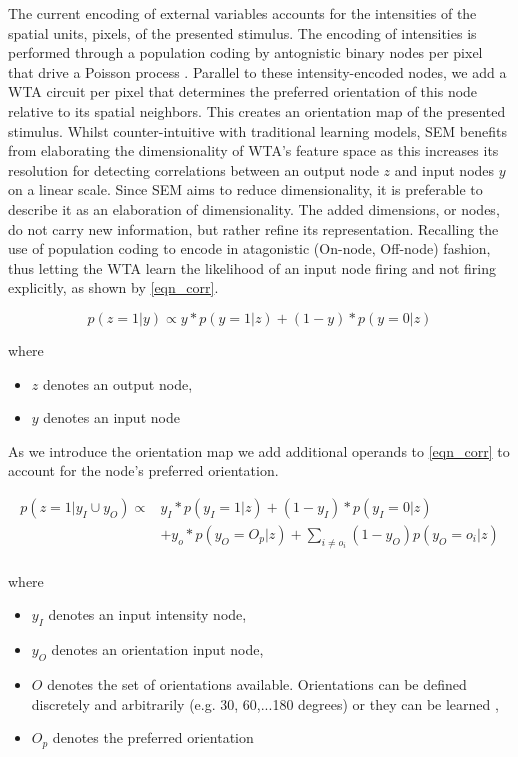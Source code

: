 \documentclass{report}
\begin{document}
The current encoding of external variables accounts for the intensities of the spatial units, pixels, of the presented stimulus. The encoding of intensities is performed through a population coding by antognistic binary nodes per pixel that drive a Poisson process \cite{Nessler2010}. Parallel to these intensity-encoded nodes, we add a WTA circuit per pixel that determines the preferred orientation of this node relative to its spatial neighbors. This creates an orientation map of the presented stimulus. Whilst counter-intuitive with traditional learning models, SEM benefits from elaborating the dimensionality of WTA's feature space as this increases its resolution for detecting correlations between an output node $z$ and input nodes $y$ on a linear scale. Since SEM aims to reduce dimensionality, it is preferable to describe it as an elaboration of dimensionality. The added dimensions, or nodes, do not carry new information, but rather refine its representation. Recalling the use of population coding to encode in atagonistic (On-node, Off-node) fashion, thus letting the WTA learn the likelihood of an input node firing and not firing explicitly, as shown by \ref{eqn_corr}.

\begin{equation}
	p(z=1|y) \propto y*p(y=1|z) + (1-y)*p(y=0|z)
	\label{eqn_corr}
\end{equation}

where
\begin{itemize}
  \item $z$ denotes an output node,
  \item $y$ denotes an input node
\end{itemize}

As we introduce the orientation map we add additional operands to \ref{eqn_corr} to account for the node's preferred orientation.

\begin{equation}
	\begin{split}
		p(z=1|y_I \cup y_O) \propto &y_I*p(y_I=1|z) + (1-y_I)*p(y_I=0|z) \\
			&+ y_o*p(y_O=O_p|z)+\sum_{i\neq o_i} (1-y_O)p(y_O=o_i|z)\\
	\end{split}
	\label{eqn_corr2}
\end{equation}

where
\begin{itemize}
  \item $y_I$ denotes an input intensity node,
  \item $y_O$ denotes an orientation input node,
  \item $O$ denotes the set of orientations available. Orientations can be defined discretely and arbitrarily (e.g. 30, 60,...180 degrees) or they can be learned \cite{Nessler2010},
  \item $O_p$ denotes the preferred orientation
\end{itemize}
\end{document}
